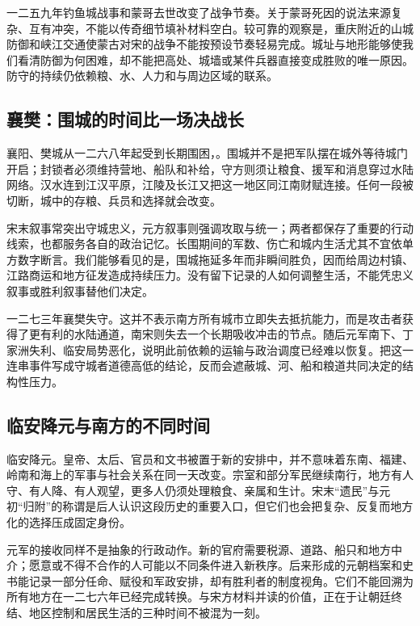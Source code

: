 一二五九年钓鱼城战事和蒙哥去世改变了战争节奏。关于蒙哥死因的说法来源复杂、互有冲突，不能以传奇细节填补材料空白。较可靠的观察是，重庆附近的山城防御和峡江交通使蒙古对宋的战争不能按预设节奏轻易完成。城址与地形能够使我们看清防御为何困难，却不能把高处、城墙或某件兵器直接变成胜败的唯一原因。防守的持续仍依赖粮、水、人力和与周边区域的联系。

\subsection{襄樊：围城的时间比一场决战长}

襄阳、樊城从一二六八年起受到长期围困，。围城并不是把军队摆在城外等待城门开启；封锁者必须维持营地、船队和补给，守方则须让粮食、援军和消息穿过水陆网络。汉水连到江汉平原，江陵及长江又把这一地区同江南财赋连接。任何一段被切断，城中的存粮、兵员和选择就会改变。

宋末叙事常突出守城忠义，元方叙事则强调攻取与统一；两者都保存了重要的行动线索，也都服务各自的政治记忆。长围期间的军数、伤亡和城内生活尤其不宜依单方数字断言。我们能够看见的是，围城拖延多年而非瞬间胜负，因而给周边村镇、江路商运和地方征发造成持续压力。没有留下记录的人如何调整生活，不能凭忠义叙事或胜利叙事替他们决定。

一二七三年襄樊失守。这并不表示南方所有城市立即失去抵抗能力，而是攻击者获得了更有利的水陆通道，南宋则失去一个长期吸收冲击的节点。随后元军南下、丁家洲失利、临安局势恶化，说明此前依赖的运输与政治调度已经难以恢复。把这一连串事件写成守城者道德高低的结论，反而会遮蔽城、河、船和粮道共同决定的结构性压力。

\subsection{临安降元与南方的不同时间}

临安降元。皇帝、太后、官员和文书被置于新的安排中，并不意味着东南、福建、岭南和海上的军事与社会关系在同一天改变。宗室和部分军民继续南行，地方有人守、有人降、有人观望，更多人仍须处理粮食、亲属和生计。宋末“遗民”与元初“归附”的称谓是后人认识这段历史的重要入口，但它们也会把复杂、反复而地方化的选择压成固定身份。

元军的接收同样不是抽象的行政动作。新的官府需要税源、道路、船只和地方中介；愿意或不得不合作的人可能以不同条件进入新秩序。后来形成的元朝档案和史书能记录一部分任命、赋役和军政安排，却有胜利者的制度视角。它们不能回溯为所有地方在一二七六年已经完成转换。与宋方材料并读的价值，正在于让朝廷终结、地区控制和居民生活的三种时间不被混为一刻。

